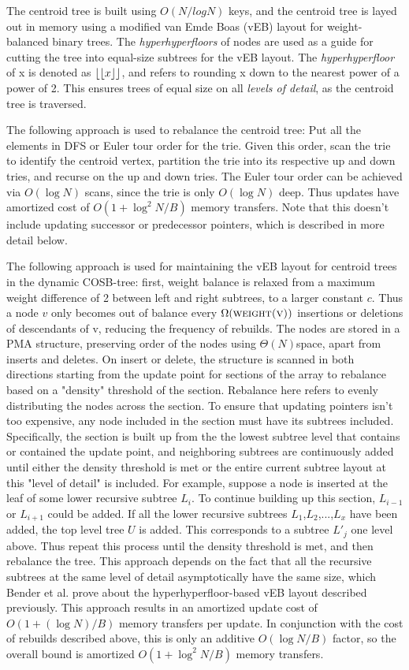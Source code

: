 \documentclass{style}
\begin{document}
The centroid tree is built using $O(N/logN)$ keys, and the centroid tree is layed out in memory using a modified van Emde Boas (vEB) layout for weight-balanced binary trees. The \emph{hyperhyperfloors} of nodes are used as a guide for cutting the tree into equal-size subtrees for the vEB layout. The \emph{hyperhyperfloor} of x is denoted as $\lfloor\lfloor{}x\rfloor\rfloor{}$, and refers to rounding x down to the nearest power of a power of 2. This ensures trees of equal size on all \emph{levels of detail}, as the centroid tree is traversed.

The following approach is used to rebalance the centroid tree: Put all the elements in DFS or Euler tour order for the trie. Given this order, scan the trie to identify the centroid vertex, partition the trie into its respective up and down tries, and recurse on the up and down tries. The Euler tour order can be achieved via $O(\log{}N)$ scans, since the trie is only $O(\log{}N)$ deep. Thus updates have amortized cost of $O(1+\log^{2}N/B)$ memory transfers. Note that this doesn't include updating successor or predecessor pointers, which is described in more detail below.

The following approach is used for maintaining the vEB layout for centroid trees in the dynamic COSB-tree: first, weight balance is relaxed from a maximum weight difference of 2 between left and right subtrees, to a larger constant $c$. Thus a node $v$ only becomes out of balance every $\Omega(\textsc{weight(v)})$ insertions or deletions of descendants of v, reducing the frequency of rebuilds. The nodes are stored in a PMA structure, preserving order of the nodes using $\Theta(N)$space, apart from inserts and deletes. On insert or delete, the structure is scanned in both directions starting from the update point for sections of the array to rebalance based on a "density" threshold of the section. Rebalance here refers to evenly distributing the nodes across the section. To ensure that updating pointers isn't too expensive, any node included in the section must have its subtrees included. Specifically, the section is built up from the the lowest subtree level that contains or contained the update point, and neighboring subtrees are continuously added until either the density threshold is met or the entire current subtree layout at this "level of detail" is included. For example, suppose a node is inserted at the leaf of some lower recursive subtree $L_{i}$. To continue building up this section, $L_{i-1}$ or $L_{i+1}$ could be added. If all the lower recursive subtrees $L_{1}$,$L_{2}$,...,$L_{x}$ have been added, the top level tree $U$ is added. This corresponds to a subtree $L'_{j}$ one level above. Thus repeat this process until the density threshold is met, and then rebalance the tree. This approach depends on the fact that all the recursive subtrees at the same level of detail asymptotically have the same size, which Bender et al. prove about the hyperhyperfloor-based vEB layout described previously. This approach results in an amortized update cost of $O(1+(\log{}N)/B)$ memory transfers per update. In conjunction with the cost of rebuilds described above, this is only an additive $O(\log{}N/B)$ factor, so the overall bound is amortized $O(1+\log^{2}N/B)$ memory transfers.
\end{document}
